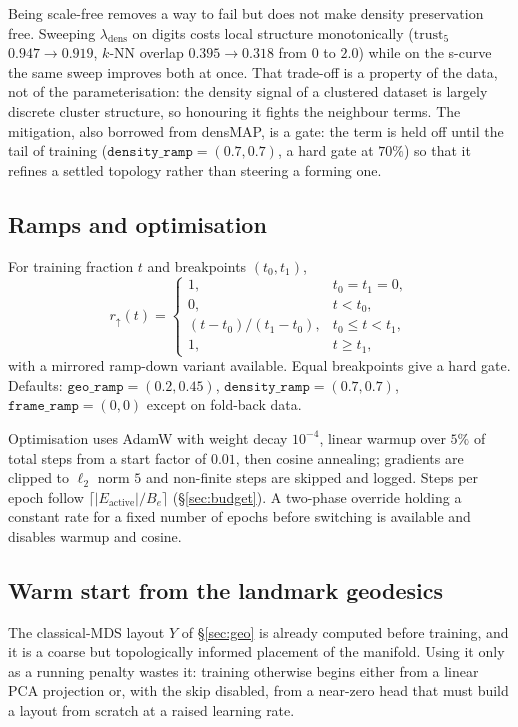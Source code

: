 \documentclass[12pt]{iopart}
\theoremstyle{definition}
\theoremstyle{plain}
\theoremstyle{remark}
\newcommand{\abs}[1]{\left\lvert#1\right\rvert}
\newcommand{\code}[1]{\texttt{#1}}
\begin{document}
Being scale-free removes a way to fail but does not make density preservation
free. Sweeping $\lambda_{\mathrm{dens}}$ on digits costs local structure
monotonically ($\mathrm{trust}_5$ $0.947\to0.919$, $k$-NN overlap
$0.395\to0.318$ from $0$ to $2.0$) while on the s-curve the same sweep improves
both at once. That trade-off is a property of the data, not of the
parameterisation: the density signal of a clustered dataset is largely discrete
cluster structure, so honouring it fights the neighbour terms. The mitigation,
also borrowed from densMAP, is a gate: the term is held off until the tail of
training ($\code{density\_ramp}=(0.7,0.7)$, a hard gate at $70\%$) so that it
refines a settled topology rather than steering a forming one.

\subsection{Ramps and optimisation}
\label{sec:ramps}

For training fraction $t$ and breakpoints $(t_0,t_1)$,
\begin{equation}
\label{eq:ramp}
r_\uparrow(t)
=
\begin{cases}
1, & t_0=t_1=0,\\
0, & t<t_0,\\
(t-t_0)/(t_1-t_0), & t_0\le t<t_1,\\
1, & t\ge t_1,
\end{cases}
\end{equation}
with a mirrored ramp-down variant available. Equal breakpoints give a hard
gate. Defaults: $\code{geo\_ramp}=(0.2,0.45)$,
$\code{density\_ramp}=(0.7,0.7)$, $\code{frame\_ramp}=(0,0)$ except on
fold-back data.

Optimisation uses AdamW with weight decay $10^{-4}$, linear warmup over $5\%$ of
total steps from a start factor of $0.01$, then cosine annealing; gradients are
clipped to $\ell_2$ norm $5$ and non-finite steps are skipped and logged. Steps
per epoch follow $\lceil\abs{E_{\mathrm{active}}}/B_e\rceil$
(\S\ref{sec:budget}). A two-phase override holding a constant rate for a fixed
number of epochs before switching is available and disables warmup and cosine.

\subsection{Warm start from the landmark geodesics}
\label{sec:warmstart}

The classical-MDS layout $Y$ of \S\ref{sec:geo} is already computed before
training, and it is a coarse but topologically informed placement of the
manifold. Using it only as a running penalty wastes it: training otherwise
begins either from a linear PCA projection or, with the skip disabled, from a
near-zero head that must build a layout from scratch at a raised learning rate.
\end{document}
